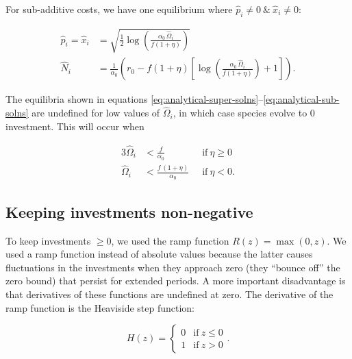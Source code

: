 For sub-additive costs, we have one equilibrium where
\(\hat{p}_{i} \neq 0\ \&\ \hat{x}_{i} \neq 0\):


\begin{equation}
\label{eq:analytical-sub-solns}
\begin{split}
    \hat{p}_i = \hat{x}_i &= \sqrt{\frac{1}{2} \log \left( 
        \frac{\alpha_0 \, \hat{\Omega}_i}{f (1 + \eta)}  \right)} \\
    \hat{N}_i &= \frac{1}{\alpha_0} \left(
        r_0 - f (1 + \eta) \left[
            \log\left( \frac{\alpha_0 \, \hat{\Omega}_i }{f (1 + \eta)}
            \right) + 1 
        \right]
    \right)
    \text{.}
\end{split}
\end{equation}


The equilibria shown in equations
\ref{eq:analytical-super-solns}--\ref{eq:analytical-sub-solns}
are undefined for low values of
\(\hat{\Omega}_{i}\), in which case species evolve to 0
investment. This will occur when


\begin{alignat*}{3}
    \hat{\Omega}_{i} &< \frac{f}{\alpha_{0}}                & \;\; \text{if}\ \eta \geq 0 \\[1ex]
    \hat{\Omega}_{i} &< \frac{f \, (1 + \eta)}{ \alpha_0}   & \;\; \text{if}\ \eta < 0
    \text{.}
\end{alignat*}



\subsection*{Keeping investments non-negative}

To keep investments \(\geq 0\), we used the ramp function
\(R(z) = \max(0,z)\). We used a ramp function instead of absolute values
because the latter causes fluctuations in the investments when they
approach zero (they ``bounce off'' the zero bound) that persist for
extended periods. A more important disadvantage is that derivatives of
these functions are undefined at zero. The derivative of the ramp
function is the Heaviside step function:

\begin{equation*}
    H(z) = \begin{cases}
        0 & \text{if}\ z \le 0 \\
        1 & \text{if}\ z > 0
        \end{cases}
    \text{.}
\end{equation*}

